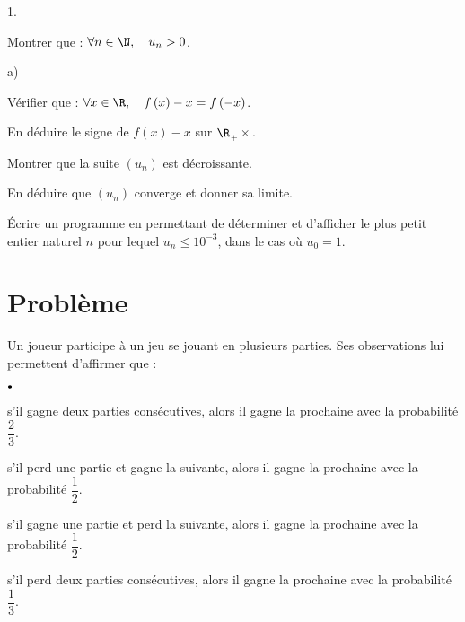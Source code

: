 \documentclass[11pt]{article}%
\begin{document}
\begin{noliste}{1.}
\vspace{0pt}

\item Montrer que : $\forall n\in \N,\quad u_{n}>0$.

\item 

\begin{noliste}{a)}
 \setlength{\itemsep}{2mm}
\item Vérifier que : $\forall x\in \R,\quad f\left( x\right)
-x = f\left( {-}x\right) $.

\item En déduire le signe de $f\left( x\right) -x$ sur
{$\R$}$_{+}{\times }$.

\item Montrer que la suite $\left( u_{n}\right) $ est décroissante.
\end{noliste}

\item En déduire que $\left( u_{n}\right) $ converge et donner sa
limite.

\item Écrire un programme en \texttt{\Scilab{}} permettant de
déterminer et
d'afficher le plus petit entier naturel $n$ pour lequel $u_{n}\leq
10^{-3}$, dans le cas où $u_{0} = 1$.
\end{noliste}

\section*{Problème}

Un joueur participe à un jeu se jouant en plusieurs parties. Ses
observations lui permettent d'affirmer que :

\begin{noliste}{$\scriptstyle \bullet$}
\item s'il gagne deux parties consécutives, alors il gagne la prochaine
avec
la probabilité $\dfrac{2}{3}$.

\item s'il perd une partie et gagne la suivante, alors il gagne la
prochaine
avec la probabilité $\dfrac{1}{2}$.

\item s'il gagne une partie et perd la suivante, alors il gagne la
prochaine
avec la probabilité $\dfrac{1}{2}$.

\item s'il perd deux parties consécutives, alors il gagne la prochaine
avec
la probabilité $\dfrac{1}{3}$.
\end{noliste}
\end{document}
